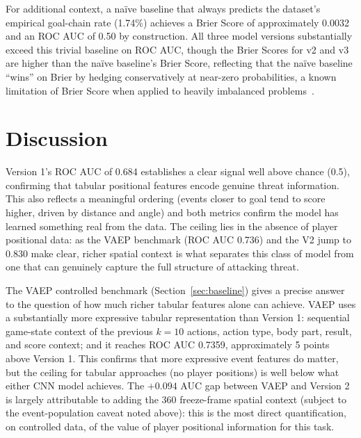 For additional context, a naïve baseline that always predicts the dataset's empirical goal-chain rate (1.74\%) achieves a Brier Score of approximately 0.0032 and an ROC AUC of 0.50 by construction. All three model versions substantially exceed this trivial baseline on ROC AUC, though the Brier Scores for v2 and v3 are higher than the naïve baseline's Brier Score, reflecting that the naïve baseline ``wins'' on Brier by hedging conservatively at near-zero probabilities, a known limitation of Brier Score when applied to heavily imbalanced problems~\cite{brier1950}.

\section{Discussion}\label{sec:comparison_discussion}

Version 1's ROC AUC of 0.684 establishes a clear signal well above chance (0.5), confirming that tabular positional features encode genuine threat information. This also reflects a meaningful ordering (events closer to goal tend to score higher, driven by distance and angle) and both metrics confirm the model has learned something real from the data. The ceiling lies in the absence of player positional data: as the VAEP benchmark (ROC AUC 0.736) and the V2 jump to 0.830 make clear, richer spatial context is what separates this class of model from one that can genuinely capture the full structure of attacking threat.

The VAEP controlled benchmark (Section~\ref{sec:baseline}) gives a precise answer to the question of how much richer tabular features alone can achieve. VAEP uses a substantially more expressive tabular representation than Version 1: sequential game-state context of the previous $k=10$ actions, action type, body part, result, and score context; and it reaches ROC AUC 0.7359, approximately 5 points above Version 1. This confirms that more expressive event features do matter, but the ceiling for tabular approaches (no player positions) is well below what either CNN model achieves. The $+0.094$ AUC gap between VAEP and Version 2 is largely attributable to adding the 360 freeze-frame spatial context (subject to the event-population caveat noted above): this is the most direct quantification, on controlled data, of the value of player positional information for this task.

